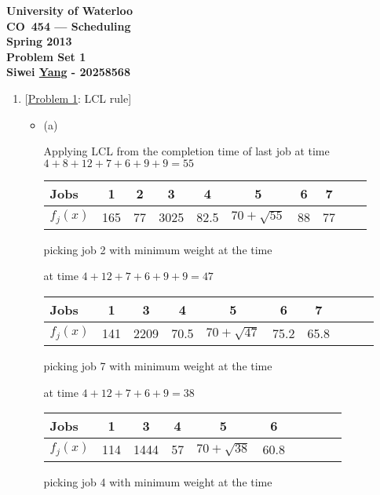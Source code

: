 \documentclass[12pt]{article}
\begin{document}
\begin{center}
\large\bf University of Waterloo\\
CO~454 --- Scheduling\\
Spring 2013\\
Problem Set 1\\
Siwei \underline{Yang} - 20258568\\
\end{center}
\bigskip

\begin{enumerate}

\item{} [\underline{Problem 1}: LCL rule]

\begin{itemize}
\item{(a)}

Applying LCL from the completion time of last job at time $4 + 8 + 12 + 7 + 6 + 9 + 9 = 55$
\begin{center}
\begin{tabular}{l*{8}{c}r}
Jobs          & 1 & 2 & 3 & 4 & 5 & 6 & 7                                         \\
\hline
$f_{j}(x)$    & 165 & 77 & 3025 & 82.5 & $70 + \sqrt{55}$ & 88 & 77               \\
\end{tabular}
\end{center}
picking job 2 with minimum weight at the time

at time $4 + 12 + 7 + 6 + 9 + 9 = 47$
\begin{center}
\begin{tabular}{l*{8}{c}r}
Jobs          & 1 & 3 & 4 & 5 & 6 & 7                                         \\
\hline
$f_{j}(x)$    & 141 & 2209 & 70.5 & $70 + \sqrt{47}$ & 75.2 & 65.8            \\
\end{tabular}
\end{center}
picking job 7 with minimum weight at the time

at time $4 + 12 + 7 + 6 + 9 = 38$
\begin{center}
\begin{tabular}{l*{8}{c}r}
Jobs          & 1 & 3 & 4 & 5 & 6                                       \\
\hline
$f_{j}(x)$    & 114 & 1444 & 57 & $70 + \sqrt{38}$ & 60.8               \\
\end{tabular}
\end{center}
picking job 4 with minimum weight at the time


\end{itemize}
\end{enumerate}
\end{document}
